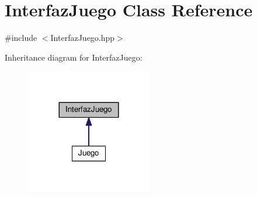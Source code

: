 \hypertarget{class_interfaz_juego}{}\section{Interfaz\+Juego Class Reference}
\label{class_interfaz_juego}


{\ttfamily \#include $<$Interfaz\+Juego.\+hpp$>$}



Inheritance diagram for Interfaz\+Juego\+:\nopagebreak
\begin{figure}[H]
\begin{center}
\leavevmode
\includegraphics[width=156pt]{class_interfaz_juego__inherit__graph}
\end{center}
\end{figure}
